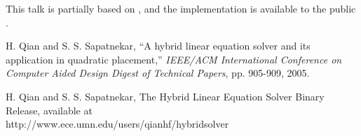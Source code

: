 \documentclass{report}
\begin{document}
This talk is partially based on \cite{1}, and the implementation is
available to the public \cite{2}.

\begin{thebibliography}{2}

H. Qian and S. S. Sapatnekar,
``A hybrid linear equation solver and its application in quadratic placement,''
\emph{IEEE/ACM International Conference on Computer Aided Design Digest
of Technical Papers}, pp. 905-909, 2005.

H. Qian and S. S. Sapatnekar,
The Hybrid Linear Equation Solver Binary Release, available at\\
http://www.ece.umn.edu/users/qianhf/hybridsolver

\end{thebibliography}
\end{document}
